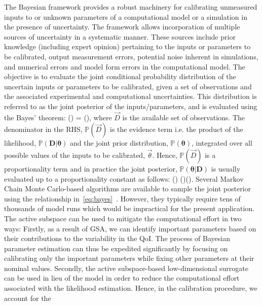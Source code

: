 The Bayesian framework provides a robust machinery for calibrating unmeasured inputs to 
or unknown parameters of a computational model or
a simulation in the presence of uncertainty. The framework allows incorporation of multiple
sources of uncertainty in a systematic manner. These sources include prior knowledge
(including expert opinion)
 pertaining to the inputs or parameters to be calibrated, output measurement errors, potential noise inherent
in simulations, and numerical errors and model form errors in the computational model.
 The objective is to evaluate the joint
conditional probability distribution of the uncertain inputs or parameters to be calibrated,
given a set of observations and the
associated experimental and computational uncertainties. This distribution is referred to as
the joint posterior of the inputs/parameters, and is evaluated using the Bayes' theorem:
%
\be
{}(\bm{\theta}\vert {}) = 
(\bm{\theta}),
\ee
%
where $\vec{D}$ is the available set of observations. 
The denominator in the RHS, $\mathbb{P}(\vec{D})$ is the evidence term i.e. the product of the likelihood, 
$\mathbb{P}(\bm{D}\vert\bm{\theta})$ and the joint prior distribution,
$\mathbb{P}(\bm{\theta})$, integrated over all possible values of the inputs to be calibrated, $\vec{\theta}$. 
Hence, $\mathbb{P}(\vec{D})$ is a proportionality term and in practice the joint posterior, 
$\mathbb{P}(\bm{\theta}\vert \bm{D})$ is usually evaluated up to a proportionality constant as follows:
%
\be
{}(\bm{\theta}\vert {}) \propto
{}(\vert\bm{\theta})(\bm{\theta}).
\label{eq:bayes}
\ee
%
Several Markov Chain Monte Carlo-based algorithms are available to sample the joint posterior
using the relationship in~\eqref{eq:bayes}~\cite{Haario:2001, Haario:2006,Xu:2014}.
However, they typically require tens of thousands of model runs which would be
impractical for the present application. The active subspace can be used to mitigate the
computational effort in two ways: Firstly, as a result of GSA, we can identify important 
parameters based on their contributions to the variability in the QoI. The process of Bayesian
parameter estimation can thus be expedited significantly by focusing on calibrating only the 
important parameters while fixing other parameters at their nominal values. Secondly, 
the active subspace-based low-dimensional surrogate can be used in lieu of the model in
order to reduce the computational effort associated with the
likelihood estimation. Hence, in the calibration procedure, we account for the 
